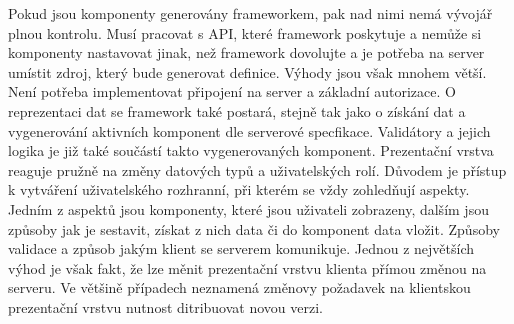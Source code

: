 Pokud jsou komponenty generovány frameworkem, pak nad nimi nemá vývojář plnou kontrolu. Musí pracovat s API, které framework poskytuje a nemůže si komponenty nastavovat jinak, než framework dovolujte a je potřeba na server umístit zdroj, který bude generovat definice. Výhody jsou však mnohem větší. Není potřeba implementovat připojení na server a základní autorizace. O reprezentaci dat se framework také postará, stejně tak jako o získání dat a vygenerování aktivních komponent dle serverové specfikace. Validátory a jejich logika je již také součástí takto vygenerovaných komponent. Prezentační vrstva reaguje pružně na změny datových typů a uživatelských rolí. Důvodem je přístup k vytváření uživatelského rozhranní, při kterém se vždy zohledňují aspekty. Jedním z aspektů jsou komponenty, které jsou uživateli zobrazeny, dalším jsou způsoby jak je sestavit, získat z nich data či do komponent data vložit. Způsoby validace a způsob jakým klient se serverem komunikuje. Jednou z největších výhod je však fakt, že lze měnit prezentační vrstvu klienta přímou změnou na serveru. Ve většině případech neznamená změnovy požadavek na klientskou prezentační vrstvu nutnost ditribuovat novou verzi.
